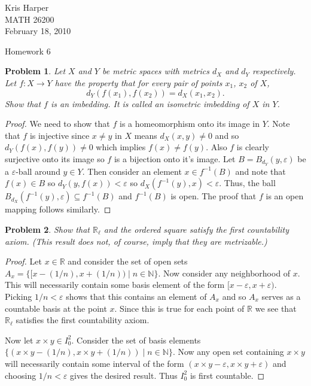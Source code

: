 \documentclass{article}
\newtheorem{problem}{Problem}
\begin{document}
\begin{flushright}
Kris Harper\\

MATH 26200\\

February 18, 2010
\end{flushright}

\begin{center}
Homework 6
\end{center}

\begin{problem}
Let $X$ and $Y$ be metric spaces with metrics $d_X$ and $d_Y$ respectively. Let $f : X \to Y$ have the property that for every pair of points $x_1$, $x_2$ of $X$,
\[
d_Y(f(x_1),f(x_2)) = d_X(x_1,x_2).
\]
Show that $f$ is an imbedding. It is called an \emph{isometric imbedding} of $X$ in $Y$.
\end{problem}
\begin{proof}
We need to show that $f$ is a homeomorphism onto its image in $Y$. Note that $f$ is injective since $x \neq y$ in $X$ means $d_X(x,y) \neq 0$ and so $d_Y(f(x),f(y)) \neq 0$ which implies $f(x) \neq f(y)$. Also $f$ is clearly surjective onto its image so $f$ is a bijection onto it's image. Let $B = B_{d_Y}(y,\varepsilon)$ be a $\varepsilon$-ball around $y \in Y$. Then consider an element $x \in f^{-1}(B)$ and note that $f(x) \in B$ so $d_Y(y,f(x)) < \varepsilon$ so $d_X(f^{-1}(y),x) < \varepsilon$. Thus, the ball $B_{d_X}(f^{-1}(y),\varepsilon) \subseteq f^{-1}(B)$ and $f^{-1}(B)$ is open. The proof that $f$ is an open mapping follows similarly.
\end{proof}

\begin{problem}
Show that $\mathbb{R}_{\ell}$ and the ordered square satisfy the first countability axiom. (This result does not, of course, imply that they are metrizable.)
\end{problem}
\begin{proof}
Let $x \in \mathbb{R}$ and consider the set of open sets $A_x = \{[x-(1/n), x+(1/n)) \mid n \in \mathbb{N}\}$. Now consider any neighborhood of $x$. This will necessarily contain some basis element of the form $[x-\varepsilon, x+\varepsilon)$. Picking $1/n < \varepsilon$ shows that this contains an element of $A_x$ and so $A_x$ serves as a countable basis at the point $x$. Since this is true for each point of $\mathbb{R}$ we see that $\mathbb{R}_{\ell}$ satisfies the first countability axiom.

Now let $x \times y \in I_0^2$. Consider the set of basis elements $\{(x \times y-(1/n), x \times y + (1/n)) \mid n \in \mathbb{N}\}$. Now any open set containing $x \times y$ will necessarily contain some interval of the form $(x \times y - \varepsilon, x \times y + \varepsilon)$ and choosing $1/n < \varepsilon$ gives the desired result. Thus $I_0^2$ is first countable.
\end{proof}
\end{document}
